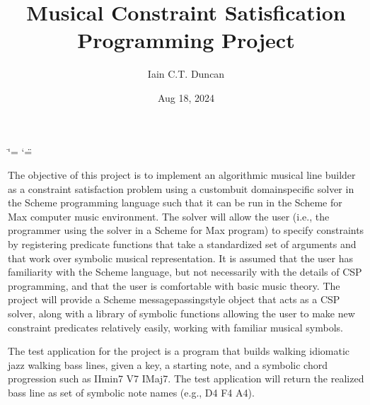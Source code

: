 \documentclass[letterpaper,10pt,english]{sphinxmanual}
\title{Musical Constraint Satisfication Programming Project}
\date{Aug 18, 2024}
\author{Iain C.T.\@{} Duncan}
\begin{document}
\ifdefined\shorthandoff
  \ifnum\catcode`\=\string=\active\shorthandoff{=}\fi
  \ifnum\catcode`\"=\active{}\fi
\fi

\pagestyle{empty}
\sphinxmaketitle
\pagestyle{plain}
\sphinxtableofcontents
\pagestyle{normal}
\label{\detokenize{index::doc}}


\sphinxAtStartPar
The objective of this project is to implement an algorithmic musical line builder as
a constraint satisfaction problem using a custom\sphinxhyphen{}buit domain\sphinxhyphen{}specific solver in the
Scheme programming language such that it can be run in the Scheme for Max computer music environment.
The solver will allow the user (i.e., the programmer using the solver in a Scheme
for Max program) to specify constraints by registering predicate functions that take
a standardized set of arguments and that work over symbolic musical representation.
It is assumed that the user has familiarity with the Scheme language, but not necessarily
with the details of CSP programming, and that the user is comfortable with basic music theory.
The project will provide a Scheme message\sphinxhyphen{}passing\sphinxhyphen{}style object that acts as a CSP solver,
along with a library of symbolic functions allowing the user to make new constraint predicates
relatively easily, working with familiar musical symbols.

\sphinxAtStartPar
The test application for the project is a program that builds walking idiomatic
jazz walking bass lines, given a key, a starting note, and a symbolic chord progression such as IImin7 V7 IMaj7.
The test application will return the realized bass line as set of symbolic note names (e.g., D4 F4 A4).
\end{document}
